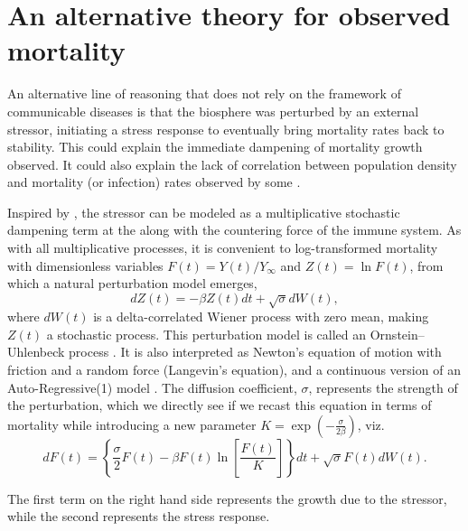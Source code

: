 \documentclass{article}
\begin{document}
\section{An alternative theory for observed mortality}
An alternative line of reasoning that does not rely on the framework of communicable diseases is that the biosphere was perturbed by an external stressor, initiating a stress response to eventually bring mortality rates back to stability. 
This could explain the immediate dampening of mortality growth observed. 
It could also explain the lack of correlation between population density and mortality (or infection) rates observed by some \citep{Hamidi2020,Hamidi2020a,Carozzi2020,Arpino2020,khavarian2021high,barak2021urban}.

Inspired by  \citet{de2014stochastic}, the stressor can be modeled as a multiplicative stochastic dampening term at the along with the countering force of the immune system. 
As with all multiplicative processes, it is convenient to log-transformed mortality with dimensionless variables $F(t)=Y(t)/Y_\infty$ and $Z(t)=\ln{F}(t)$, from which a natural perturbation model emerges,
\begin{equation}
\label{eq:microscopic}
dZ(t)= -\beta Z(t) dt + \sqrt{\sigma}dW(t),
\end{equation}
where $dW(t)$ is a delta-correlated Wiener process with zero mean, making $Z(t)$ a stochastic process. This perturbation model is called an Ornstein–Uhlenbeck process \citep{risken1996fokker}. It is also interpreted as Newton's equation of motion with friction and a random force (Langevin's equation), and a continuous version of an Auto-Regressive(1) model \citep{akaike1970statistical}. The diffusion coefficient, $\sigma$, represents the strength of the perturbation, which we directly see if we recast this equation in terms of mortality while introducing a new parameter $K=\exp{(-\frac{\sigma}{2\beta})}$, viz. 
\begin{equation}
\label{eq:microscopicOriginal}
dF(t) = \left\{\frac{\sigma}{2}F(t) - \beta F(t)\ln\left[\frac{F(t)}{K}\right]\right\}dt + \sqrt{\sigma}F(t)dW(t).
\end{equation}

The first term on the right hand side represents the growth due to the stressor, while the second represents the stress response. 
\end{document}
